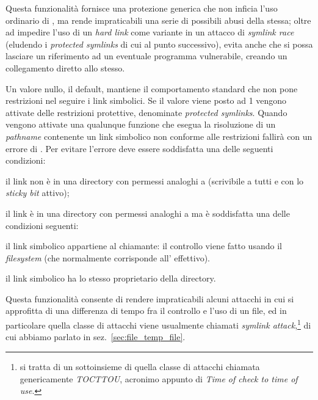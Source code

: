 \begin{basedescript}{\desclabelwidth{1cm}\desclabelstyle{\nextlinelabel}}
  Questa funzionalità fornisce una protezione generica che non inficia l'uso
  ordinario di , ma rende impraticabili una serie di possibili
  abusi della stessa; oltre ad impedire l'uso di un \textit{hard link} come
  variante in un attacco di \textit{symlink race} (eludendo i
  \textit{protected symlinks} di cui al punto successivo), evita anche che si
  possa lasciare un riferimento ad un eventuale programma 
  vulnerabile, creando un collegamento diretto allo stesso.


\item[\sysctlrelfiled{fs}{protected\_symlinks}] Un valore nullo, il default,
  mantiene il comportamento standard che non pone restrizioni nel seguire i
  link simbolici. Se il valore viene posto ad 1 vengono attivate delle
  restrizioni protettive, denominate 
  \textit{protected symlinks}. Quando vengono attivate una qualunque funzione
  che esegua la risoluzione di un \textit{pathname} contenente un link
  simbolico non conforme alle restrizioni fallirà con un errore di
  . Per evitare l'errore deve essere soddisfatta una delle
  seguenti condizioni:
  \begin{itemize*}
  \item il link non è in una directory con permessi analoghi a 
    (scrivibile a tutti e con lo \textit{sticky bit} attivo);
  \item il link è in una directory con permessi analoghi a  ma è
    soddisfatta una delle condizioni seguenti: 
    \begin{itemize*}
    \item il link simbolico appartiene al chiamante: il controllo viene fatto
      usando il \textit{filesystem}  (che normalmente corrisponde
      all' effettivo).
    \item il link simbolico ha lo stesso proprietario della directory.
    \end{itemize*}
  \end{itemize*}

  Questa funzionalità consente di rendere impraticabili alcuni attacchi in cui
  si approfitta di una differenza di tempo fra il controllo e l'uso di un
  file, ed in particolare quella classe di attacchi viene usualmente chiamati
  \textit{symlink attack},\footnote{si tratta di un sottoinsieme di quella
    classe di attacchi chiamata genericamente \textit{TOCTTOU}, acronimo
    appunto di \textit{Time of check to time of use}.} di cui abbiamo parlato
  in sez.~\ref{sec:file_temp_file}.


\end{basedescript}
